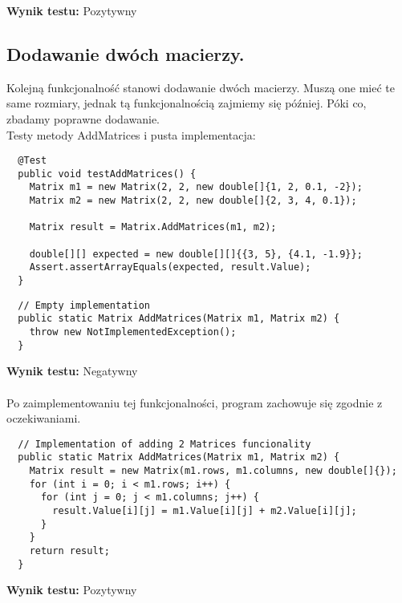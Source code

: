 \documentclass[a4paper,12pt,twoside]{article}
\begin{document}
\noindent
\textbf{Wynik testu: }{\color{green} Pozytywny}


\subsection{Dodawanie dwóch macierzy.}
\bigskip


Kolejną funkcjonalność stanowi dodawanie dwóch macierzy. Muszą one mieć te same
rozmiary, jednak tą funkcjonalnością zajmiemy się później. Póki co, zbadamy poprawne
dodawanie.\\

\noindent
Testy metody AddMatrices i pusta implementacja:\\

\begin{lstlisting}
  @Test
  public void testAddMatrices() {
    Matrix m1 = new Matrix(2, 2, new double[]{1, 2, 0.1, -2});
    Matrix m2 = new Matrix(2, 2, new double[]{2, 3, 4, 0.1});

    Matrix result = Matrix.AddMatrices(m1, m2);

    double[][] expected = new double[][]{{3, 5}, {4.1, -1.9}};
    Assert.assertArrayEquals(expected, result.Value);
  }
\end{lstlisting}

\begin{lstlisting}
  // Empty implementation
  public static Matrix AddMatrices(Matrix m1, Matrix m2) {
    throw new NotImplementedException();
  }
\end{lstlisting}
\medskip

\noindent
\textbf{Wynik testu: }{\color{red} Negatywny}\\\\
Po zaimplementowaniu tej funkcjonalności, program
zachowuje się zgodnie z oczekiwaniami.\\

\begin{lstlisting}
  // Implementation of adding 2 Matrices funcionality
  public static Matrix AddMatrices(Matrix m1, Matrix m2) {
    Matrix result = new Matrix(m1.rows, m1.columns, new double[]{});
    for (int i = 0; i < m1.rows; i++) {
      for (int j = 0; j < m1.columns; j++) {
        result.Value[i][j] = m1.Value[i][j] + m2.Value[i][j];
      }
    }
    return result;
  }
\end{lstlisting}
\medskip

\noindent
\textbf{Wynik testu: }{\color{green} Pozytywny}
\end{document}
